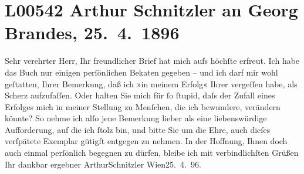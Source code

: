 

\section[Arthur Schnitzler an Georg Brandes, 25. 4. 1896]{L00542 Arthur Schnitzler an Georg Brandes, 25. 4. 1896}
\nopagebreak{}
\rehead{ }\normalsize\beginnumbering{}
\toendnotes[C]{\smallbreak\pagebreak[2]}
\toendnotes[C]{\smallbreak}
\pstart\center{}{\pb}Sehr verehrter Herr,\pend\vspace{0.5em}
\pstart
           Ihr freundlicher Brief hat mich aufs höchſte erfreut. Ich habe das Buch nur einigen perſönlichen Beka{\geminationn}ten gegeben – und ich darf mir wohl geſtatten, Ihrer
               Bemerkung, daß ich »in meinem Erfolg« Ihrer vergeſſen habe, als Scherz aufzufaſſen.
                  {\pb}Oder halten Sie mich für ſo ſtupid, daſs der
               Zufall eines Erfolges mich in meiner Stellung zu Menſchen, die ich bewundere,
               verändern könnte? So nehme ich alſo jene Bemerkung lieber als eine liebenswürdige
               Aufforderung, auf die ich ſtolz bin, und bitte Sie um die Ehre, auch dieſes
               verſpätete Exemplar gütigſt
               entgegen zu nehmen.\pend
           \pstart {\pb}In der Hoffnung, Ihnen doch auch einmal
               perſönlich begegnen zu dürfen, bleibe ich mit verbindlichſten Grüßen Ihr dankbar
               ergebner \spacefill\mbox{ArthurSchnitzler}\pend{}
\pstart
           Wien25. 4. 96.\pend
           \endnumbering{}  
      
